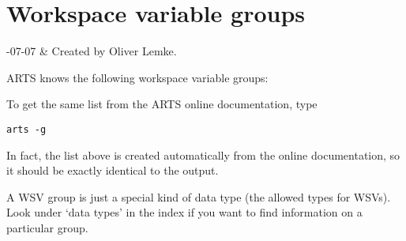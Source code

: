 \chapter{Workspace variable groups}
\label{app:groups}


-07-07 & Created by Oliver Lemke. \\
\stophistory

ARTS knows the following workspace variable groups:


\noindent
To get the same list from the ARTS online documentation, type

\begin{verbatim}
arts -g
\end{verbatim}

\noindent
In fact, the list above is created automatically from the online
documentation, so it should be exactly identical to the
 output. 

A WSV group is just a special kind of data type (the allowed types for
WSVs). Look under `data types' in the index if you want to find
information on a particular group.


